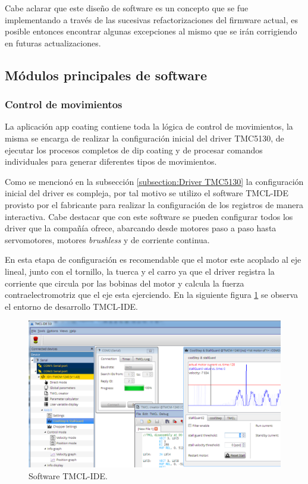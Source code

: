 Cabe aclarar que este diseño de software es un concepto que se fue implementando a través de las sucesivas refactorizaciones del firmware actual, es posible entonces encontrar algunas excepciones al mismo que se irán corrigiendo en futuras actualizaciones.


\subsection{Módulos principales de software}
\label{sec:modulos principales}
\subsubsection{Control de movimientos}

La aplicación app coating contiene toda la lógica de control de movimientos, la misma se encarga de realizar la configuración inicial del driver TMC5130, de ejecutar los procesos completos de dip coating y de procesar comandos individuales para generar diferentes tipos de movimientos. 

Como se mencionó en la subsección \ref{subsection:Driver TMC5130} la configuración inicial del driver es compleja, por tal motivo se utilizo el software  TMCL-IDE provisto por el fabricante para realizar la configuración de los registros de manera interactiva. Cabe destacar que con este software se pueden configurar todos los driver que la compañía ofrece, abarcando desde motores paso a paso hasta  servomotores, motores \textit{brushless} y de corriente continua. 

En esta etapa de configuración es recomendable que el motor este acoplado al eje lineal, junto con el tornillo, la tuerca y el carro ya que el driver registra la corriente que circula por las bobinas del motor y calcula la fuerza contraelectromotriz que el eje esta ejerciendo. 
En la siguiente figura \ref{fig:tmcl_ide} se observa el entorno de desarrollo TMCL-IDE.  

\begin{figure}[h!t]
	\centering
	\includegraphics[width=1\textwidth]{./Figures/tmcl_ide_1.png}
	\caption{Software TMCL-IDE.}
	\label{fig:tmcl_ide}
\end{figure}


